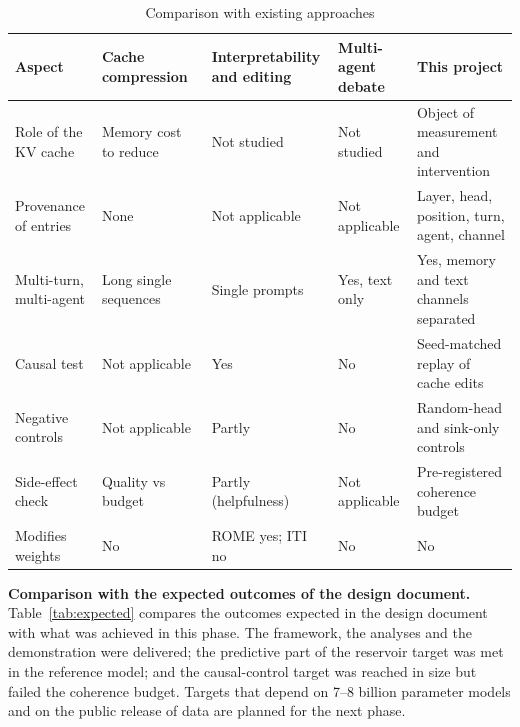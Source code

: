 \begin{table}[htbp]
\centering
\caption{Comparison with existing approaches}\label{tab:compare}
\small
\setlength{\tabcolsep}{4pt}
\begin{tabularx}{\textwidth}{@{}L{3.6cm}YYYY@{}}
\toprule
\textbf{Aspect} & \textbf{Cache compression~\cite{xiao2024sinks,zhang2023h2o,oren2024msrnn}} & \textbf{Interpretability and editing~\cite{vig2020causal,meng2022rome,li2023iti}} & \textbf{Multi-agent debate~\cite{du2024debate}} & \textbf{This project} \\
\midrule
Role of the KV cache & Memory cost to reduce & Not studied & Not studied & Object of measurement and intervention \\
Provenance of entries & None & Not applicable & Not applicable & Layer, head, position, turn, agent, channel \\
Multi-turn, multi-agent & Long single sequences & Single prompts & Yes, text only & Yes, memory and text channels separated \\
Causal test & Not applicable & Yes & No & Seed-matched replay of cache edits \\
Negative controls & Not applicable & Partly & No & Random-head and sink-only controls \\
Side-effect check & Quality vs budget & Partly (helpfulness) & Not applicable & Pre-registered coherence budget \\
Modifies weights & No & ROME yes; ITI no & No & No \\
\bottomrule
\end{tabularx}
\end{table}

\textbf{Comparison with the expected outcomes of the design document.} Table~\ref{tab:expected} compares the outcomes expected in the design document with what was achieved in this phase. The framework, the analyses and the demonstration were delivered; the predictive part of the reservoir target was met in the reference model; and the causal-control target was reached in size but failed the coherence budget. Targets that depend on 7--8 billion parameter models and on the public release of data are planned for the next phase.

